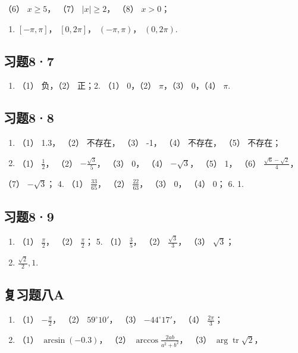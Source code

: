 （6） \(x \geqslant 5\)， （7） \(|x| \geqslant 2\)， （8） \(x > 0\)；

\begin{enumerate}[start=6]
\item
  \([- \pi, \pi]\)， \([0, 2\pi]\)， \((- \pi, \pi)\)， \((0, 2\pi)\).
\end{enumerate}

\subsection{习题8·7}

\begin{enumerate}
\item
  （1） 负，（2） 正；2. （1） 0，（2） \(\pi\)，（3） 0，（4） \(\pi\).
\end{enumerate}

\subsection{习题8·8}

\begin{enumerate}
\item
  （1） 1.3， （2） 不存在， （3） -1， （4） 不存在， （5） 不存在；
\item
  （1） \(\frac{1}{2}\)， （2） \(-\frac{\sqrt{3}}{5}\)， （3） 0，
  （4） \(-\sqrt{3}\)， （5） 1， （6）
  \(\frac{\sqrt{6} - \sqrt{2}}{4}\)，
\end{enumerate}

（7） \(-\sqrt{3}\)； 4. （1） \(\frac{33}{65}\)， （2）
\(\frac{22}{63}\)， （3） 0， （4） 0； 6. 1.

\subsection{习题8·9}

\begin{enumerate}
\item
  （1） \(\frac{\pi}{2}\)， （2） \(\frac{\pi}{2}\)； 5. （1）
  \(\frac{3}{5}\)， （2） \(\frac{\sqrt{3}}{3}\)， （3） \(\sqrt{3}\)；
\item
  \(\frac{\sqrt{2}}{2}, 1.\)
\end{enumerate}

\subsection{复习题八A}

\begin{enumerate}
\item
  （1） \(-\frac{\pi}{2}\)， （2） \(59^{\circ}10'\)， （3）
  \(-44^{\circ}17'\)， （4） \(\frac{2\pi}{3}\)；
\item
  （1） \(\arcsin(-0.3)\)， （2） \(\arccos \frac{2ab}{a^2 + b^2}\)，
  （3） \(\arg \operatorname{tr} \sqrt{2}\)，
\end{enumerate}

